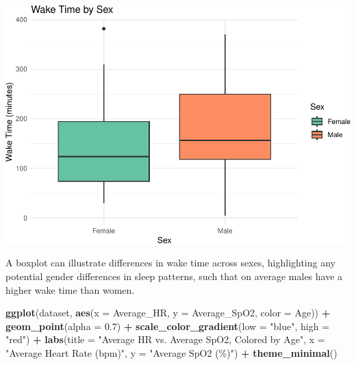 \documentclass[
]{article}
\newenvironment{Shaded}{\begin{snugshade}}{\end{snugshade}}
\newcommand{\AttributeTok}[1]{\textcolor[rgb]{0.13,0.29,0.53}{#1}}
\newcommand{\FloatTok}[1]{\textcolor[rgb]{0.00,0.00,0.81}{#1}}
\newcommand{\FunctionTok}[1]{\textcolor[rgb]{0.13,0.29,0.53}{\textbf{#1}}}
\newcommand{\NormalTok}[1]{#1}
\newcommand{\SpecialCharTok}[1]{\textcolor[rgb]{0.81,0.36,0.00}{\textbf{#1}}}
\newcommand{\StringTok}[1]{\textcolor[rgb]{0.31,0.60,0.02}{#1}}
\begin{document}
\includegraphics{602_project_files/figure-latex/unnamed-chunk-16-1.pdf}

A boxplot can illustrate differences in wake time across sexes,
highlighting any potential gender differences in sleep patterns, such
that on average males have a higher wake time than women.

\begin{Shaded}
\begin{Highlighting}[]
\FunctionTok{ggplot}\NormalTok{(dataset, }\FunctionTok{aes}\NormalTok{(}\AttributeTok{x =}\NormalTok{ Average\_HR, }\AttributeTok{y =}\NormalTok{ Average\_SpO2, }\AttributeTok{color =}\NormalTok{ Age)) }\SpecialCharTok{+}
    \FunctionTok{geom\_point}\NormalTok{(}\AttributeTok{alpha =} \FloatTok{0.7}\NormalTok{) }\SpecialCharTok{+} \FunctionTok{scale\_color\_gradient}\NormalTok{(}\AttributeTok{low =} \StringTok{"blue"}\NormalTok{,}
    \AttributeTok{high =} \StringTok{"red"}\NormalTok{) }\SpecialCharTok{+} \FunctionTok{labs}\NormalTok{(}\AttributeTok{title =} \StringTok{"Average HR vs. Average SpO2, Colored by Age"}\NormalTok{,}
    \AttributeTok{x =} \StringTok{"Average Heart Rate (bpm)"}\NormalTok{, }\AttributeTok{y =} \StringTok{"Average SpO2 (\%)"}\NormalTok{) }\SpecialCharTok{+}
    \FunctionTok{theme\_minimal}\NormalTok{()}
\end{Highlighting}
\end{Shaded}
\end{document}
